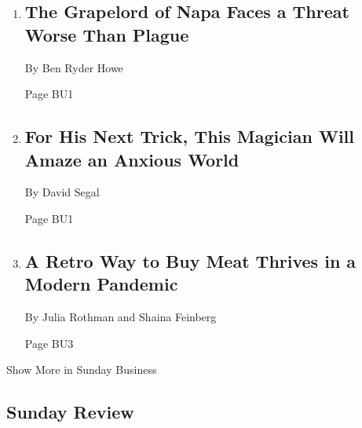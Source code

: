 \begin{enumerate}
\def\labelenumi{\arabic{enumi}.}
\item
  \href{/2020/05/09/business/beckstoffer-wine-napa.html}{}

  \hypertarget{the-grapelord-of-napa-faces-a-threat-worse-than-plague}{%
  \subsection{The Grapelord of Napa Faces a Threat Worse Than
  Plague}\label{the-grapelord-of-napa-faces-a-threat-worse-than-plague}}

  By Ben Ryder Howe

  Page BU1
\item
  \href{/2020/05/05/business/karan-singh-magic.html}{}

  \hypertarget{for-his-next-trick-this-magician-will-amaze-an-anxious-world-1}{%
  \subsection{For His Next Trick, This Magician Will Amaze an Anxious
  World}\label{for-his-next-trick-this-magician-will-amaze-an-anxious-world-1}}

  By David Segal

  Page BU1
\item
  \href{/2020/05/07/business/coronavirus-meat-vending-machines.html}{}

  \hypertarget{a-retro-way-to-buy-meat-thrives-in-a-modern-pandemic}{%
  \subsection{A Retro Way to Buy Meat Thrives in a Modern
  Pandemic}\label{a-retro-way-to-buy-meat-thrives-in-a-modern-pandemic}}

  By Julia Rothman and Shaina Feinberg

  Page BU3
\end{enumerate}

Show More in Sunday Business

\hypertarget{sunday-review}{%
\subsection{Sunday Review}\label{sunday-review}}

